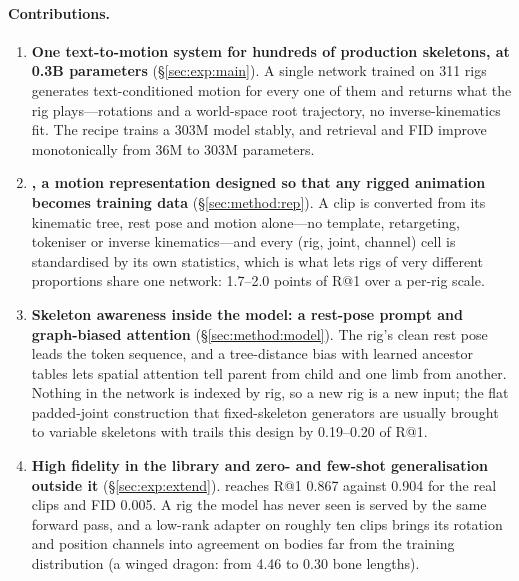 \paragraph{Contributions.}
\begin{enumerate}[leftmargin=*,itemsep=1pt,topsep=2pt]
\item \textbf{One text-to-motion system for hundreds of production skeletons, at 0.3B parameters}
  (\S\ref{sec:exp:main}). A single network trained on \num{311} rigs generates text-conditioned motion for
  every one of them and returns what the rig plays---rotations and a world-space root trajectory, no
  inverse-kinematics fit. The recipe trains a \num{303}M model stably, and retrieval and FID improve
  monotonically from \num{36}M to \num{303}M parameters.
\item \textbf{\rep{}, a motion representation designed so that any rigged animation becomes training data}
  (\S\ref{sec:method:rep}). A clip is converted from its kinematic tree, rest pose and motion alone---no
  template, retargeting, tokeniser or inverse kinematics---and every (rig, joint, channel) cell is
  standardised by its own statistics, which is what lets rigs of very different proportions share one
  network: 1.7--2.0 points of R@1 over a per-rig scale.
\item \textbf{Skeleton awareness inside the model: a rest-pose prompt and graph-biased attention}
  (\S\ref{sec:method:model}). The rig's clean rest pose leads the token sequence, and a tree-distance bias
  with learned ancestor tables lets spatial attention tell parent from child and one limb from another.
  Nothing in the network is indexed by rig, so a new rig is a new input; the flat padded-joint construction
  that fixed-skeleton generators are usually brought to variable skeletons with trails this design by
  0.19--0.20 of R@1.
\item \textbf{High fidelity in the library and zero- and few-shot generalisation outside it}
  (\S\ref{sec:exp:extend}). \method{} reaches R@1 \num{0.867} against \num{0.904} for the real clips and
  FID \num{0.005}. A rig the model has never seen is served by the same forward pass, and a low-rank adapter
  on roughly ten clips brings its rotation and position channels into agreement on bodies far from the
  training distribution (a winged dragon: from \num{4.46} to \num{0.30} bone lengths).
\end{enumerate}
